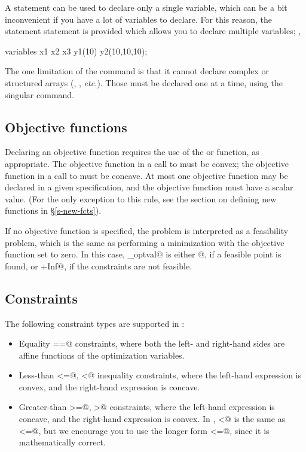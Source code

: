 \documentclass[12pt]{article}
\begin{document}
A \verb@variable@ statement can be used to declare only a single
variable, which can be a bit inconvenient if you have a lot of variables
to declare. For this reason, the statement \verb@variables@ statement
is provided which allows you to declare multiple variables; \ie,
\begin{code}
	variables x1 x2 x3 y1(10) y2(10,10,10);
\end{code}
The one limitation of the \verb@variables@ command is that it cannot
declare complex or structured arrays (\eg, \verb@symmetric@,
\emph{etc.}). Those must be declared
one at a time, using the singular \verb@variable@ command.

\subsection{Objective functions}

Declaring an objective function requires
the use of the \verb@minimize@ or \verb@maximize@ function, as
appropriate.  The objective function in a call to \verb@minimize@ 
must be convex; the objective function in a call to \verb@maximize@
must be concave. At most one objective function may be declared in a 
given \cvx specification, and the objective function must have a
scalar value. (For the only exception to this rule, see the 
section on defining new functions in \S\ref{s-new-fcts}).

If no objective function is specified, the problem is interpreted
as a feasibility problem, which is the same as performing a minimization
with the objective function set to zero. In this case, \verb@cvx_optval@
is either @, if a feasible point is found, or
\verb@+Inf@, if the constraints are not feasible.

\subsection{Constraints}

The following constraint types are supported in \cvx:
\begin{itemize}
\item Equality \verb@==@ constraints, where both the left- and right-hand
sides are affine functions of the optimization variables.
\item Less-than \verb@<=@, \verb@<@ inequality constraints, where the left-hand
expression is convex, and the right-hand expression is concave.
\item Greater-than \verb@>=@, \verb@>@ constraints, where the left-hand
expression is concave, and the right-hand expression is convex.
In \cvx, \verb@<@ is the same as \verb@<=@, but we encourage you to
use the longer form \verb@<=@, since it is mathematically correct.
\end{itemize}
\end{document}

